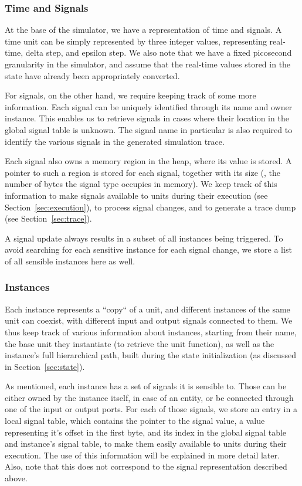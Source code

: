 
\subsubsection{Time and Signals}
At the base of the simulator, we have a representation of time and signals.
A time unit can be simply represented by three integer values, representing real-time, delta step, and epsilon step. We also note that we have a fixed picosecond granularity in the simulator, and assume that the real-time values stored in the state have already been appropriately converted.

For signals, on the other hand, we require keeping track of some more information. Each signal can be uniquely identified through its name and owner instance. This enables us to retrieve signals in cases where their location in the global signal table is unknown. The signal name in particular is also required to identify the various signals in the generated simulation trace.

Each signal also owns a memory region in the heap, where its value is stored. A pointer to such a region is stored for each signal, together with its size (\ie, the number of bytes the signal type occupies in memory). We keep track of this information to make signals available to units during their execution (see Section~\ref{sec:execution}), to process signal changes, and to generate a trace dump (see Section~\ref{sec:trace}).

A signal update always results in a subset of all instances being triggered. To avoid searching for each sensitive instance for each signal change, we store a list of all sensible instances here as well.


\subsubsection{Instances}
Each instance represents a “copy“ of a unit, and different instances of the same unit can coexist, with different input and output signals connected to them. We thus keep track of various information about instances, starting from their name, the base unit they instantiate (to retrieve the unit function), as well as the instance's full hierarchical path, built during the state initialization (as discussed in Section~\ref{sec:state}).

As mentioned, each instance has a set of signals it is sensible to. Those can be either owned by the instance itself, in case of an entity, or be connected through one of the input or output ports. For each of those signals, we store an entry in a local signal table, which contains the pointer to the signal value, a value representing it's offset in the first byte, and its index in the global signal table and instance's signal table, to make them easily available to units during their execution. The use of this information will be explained in more detail later. Also, note that this does not correspond to the signal representation described above.

